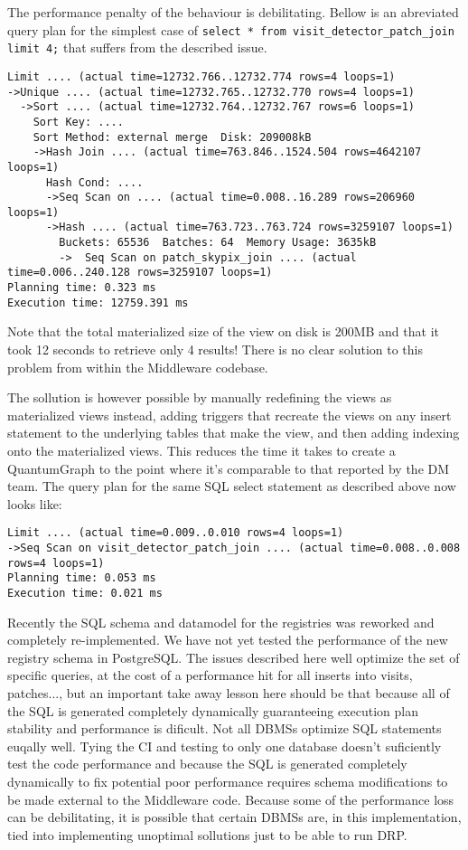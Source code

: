 The performance penalty of the behaviour is debilitating. Bellow is an abreviated query plan for the simplest case of \lstinline[basicstyle=\ttfamily]{select * from visit_detector_patch_join limit 4;} that suffers from the described issue.

\begin{lstlisting}[style=sqlprompt]
Limit .... (actual time=12732.766..12732.774 rows=4 loops=1)
->Unique .... (actual time=12732.765..12732.770 rows=4 loops=1)
  ->Sort .... (actual time=12732.764..12732.767 rows=6 loops=1)
    Sort Key: ....
    Sort Method: external merge  Disk: 209008kB
    ->Hash Join .... (actual time=763.846..1524.504 rows=4642107 loops=1)
      Hash Cond: ....
      ->Seq Scan on .... (actual time=0.008..16.289 rows=206960 loops=1)
      ->Hash .... (actual time=763.723..763.724 rows=3259107 loops=1)
        Buckets: 65536  Batches: 64  Memory Usage: 3635kB
        ->  Seq Scan on patch_skypix_join .... (actual time=0.006..240.128 rows=3259107 loops=1)
Planning time: 0.323 ms
Execution time: 12759.391 ms
\end{lstlisting}

Note that the total materialized size of the view on disk is 200MB and that it took 12 seconds to retrieve only 4 results! There is no clear solution to this problem from within the Middleware codebase. 

The sollution is however possible by manually redefining the views as materialized views instead, adding triggers that recreate the views on any insert statement to the underlying tables that make the view, and then adding indexing onto the materialized views. This reduces the time it takes to create a QuantumGraph to the point where it's comparable to that reported by the DM team. The query plan for the same SQL select statement as described above now looks like:

\begin{lstlisting}[style=sqlprompt]
Limit .... (actual time=0.009..0.010 rows=4 loops=1)
->Seq Scan on visit_detector_patch_join .... (actual time=0.008..0.008 rows=4 loops=1)
Planning time: 0.053 ms
Execution time: 0.021 ms
\end{lstlisting}

Recently the SQL schema and datamodel for the registries was reworked and completely re-implemented. We have not yet tested the performance of the new registry schema in PostgreSQL. The issues described here well optimize the set of specific queries, at the cost of a performance hit for all inserts into visits, patches..., but an important take away lesson here should be that because all of the SQL is generated completely dynamically guaranteeing execution plan stability and performance is dificult. Not all DBMSs optimize SQL statements euqally well. Tying the CI and testing to only one database doesn't suficiently test the code performance and because the SQL is generated completely dynamically to fix potential poor performance requires schema modifications to be made external to the Middleware code. Because some of the performance loss can be debilitating, it is possible that certain DBMSs are, in this implementation, tied into implementing unoptimal sollutions just to be able to run DRP. 

